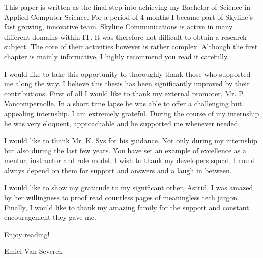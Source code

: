 This paper is written as the final step into achieving my Bachelor of Science
in Applied Computer Science. For a period of 4 months I became part of Skyline's fast growing, innovative team.
Skyline Communications is active in many different domains within IT. It was therefore not difficult to obtain
a research subject. The core of their activities however is rather complex. Although the first chapter is mainly informative, I highly recommend you read it carefully.

I would like to take this opportunity to thoroughly thank those who supported me along the way. I believe this thesis has been significantly improved by their contributions. First of all I would like to thank my external promoter, Mr. P. Vancompernolle. In a short time lapse he was able to offer a challenging but appealing internship. I am extremely grateful.
During the course of my internship he was very eloquent, approachable and he supported me whenever needed.

I would like to thank Mr. K. Sys for his guidance. Not only during my internship but also during the last few years.
You have set an example of excellence as a mentor, instructor and role model. I wish to thank my developers squad, I could always depend on them for support and answers and a laugh in between.

I would like to show my gratitude to my significant other, Astrid, I was amazed by her willingness to proof read countless pages of meaningless tech jargon.
Finally, I would like to thank my amazing family for the support and constant encouragement they gave me.

Enjoy reading!

Emiel Van Severen

